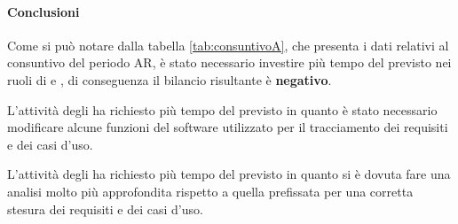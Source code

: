 \documentclass[./PianoDiProgetto.tex]{subfiles}
\begin{document}
  \paragraph{Conclusioni}
		Come si può notare dalla tabella \ref{tab:consuntivoA}, che presenta i dati relativi al consuntivo del periodo AR, è stato necessario investire più tempo del previsto nei ruoli di  \AMM{} e \AN, di conseguenza il bilancio risultante è \textbf{negativo}.
		
		L'attività degli \AMM{} ha richiesto più tempo del previsto in quanto è stato necessario modificare alcune funzioni del software utilizzato per il tracciamento dei requisiti e dei casi d'uso.
		
		L'attività degli \AN{} ha richiesto più tempo del previsto in quanto si è dovuta fare una analisi molto più approfondita rispetto a quella prefissata per una corretta stesura dei requisiti e dei casi d'uso.
\end{document}
